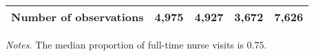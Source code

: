 \documentclass[final,12pt]{article}
\begin{document}
\begin{singlespace}
\begin{table}[H]
\begin{threeparttable}
\begin{tabular}{l*{4}c}
\midrule
Number of observations & 4,975 & 4,927 & 3,672 & 7,626\\
%
\bottomrule
\end{tabular}
	\begin{tablenotes}
	\footnotesize
	\item \emph{Notes.} The median proportion of full-time nurse visits is 0.75.
	\end{tablenotes}
\end{threeparttable}
\end{table}



\end{singlespace}
\end{document}

